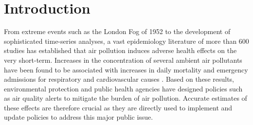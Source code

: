 \documentclass[12pt]{article}
\renewcommand{\thefootnote}{\fnsymbol{footnote}}
\begin{document}
\renewcommand{\thefootnote}{\arabic{footnote}}
\setcounter{footnote}{0}
\pagebreak \newpage

\onehalfspacing




\section{Introduction}
     
    From extreme events such as the London Fog of 1952 to the development of sophisticated time-series analyses, a vast epidemiology literature of more than 600 studies has established that air pollution induces adverse health effects on the very short-term. Increases in the concentration of several ambient air pollutants have been found to be associated with increases in daily mortality and emergency admissions for respiratory and cardiovascular causes \citep{schwartz1994people, samet2000national, le2002short, bell2004time, liu_ambient_2019}. 
    Based on these results, environmental protection and public health agencies have designed policies such as air quality alerts to mitigate the burden of air pollution. Accurate estimates of these effects are therefore crucial as they are directly used to implement and update policies to address this major public issue.
    
\end{document}
